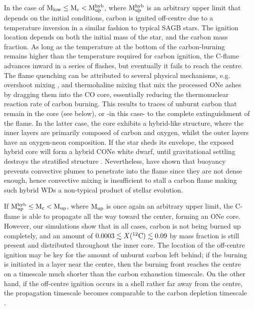 \documentclass[../../main/thesis_msc.tex]{subfiles}
\begin{document}
    In the case of $\rm M_{\rm low} \leq \rm M_c < \rm M_{\rm up}^{\rm hyb}$, where $\rm M_{\rm up}^{\rm hyb}$ is an arbitrary upper limit that depends on the initial conditions, carbon is ignited off-centre due to a temperature inversion in a similar fashion to typical SAGB stars. The ignition location  depends on both the initial mass of the star, and the carbon mass fraction. As long as the temperature at the bottom of the carbon-burning remains higher than the temperature required for carbon ignition, the C-flame advances inward in a series of flashes, but eventually it fails to reach the centre. The flame quenching can be attributed to several physical mechanisms, e.g. overshoot mixing \citep{Denissenkov:2013qaa, Chen2014, Farmer:2015afs}, and thermohaline mixing \citep{Siess2009} that mix the processed ONe ashes by dragging them into the CO core, essentially reducing the thermonuclear reaction rate of carbon burning. This results to traces of unburnt carbon that remain in the core (see below), or -in this case- to the complete extinguishment of the flame. In the latter case, the core exhibits a hybrid-like structure, where the inner layers are primarily composed of carbon and oxygen, whilst the outer layers have an oxygen-neon composition. If the star sheds its envelope, the exposed hybrid core will form a hybrid CONe white dwarf, until gravitational settling destroys the stratified structure \citep[see also][]{brooks2017, Schwab2019b}. Nevertheless, \cite{Lecoanet2016} have shown that buoyancy prevents convective plumes to penetrate into the flame since they are not dense enough, hence convective mixing is insufficient to stall a carbon flame making such hybrid WDs a non-typical product of stellar evolution.
    
    If $\rm M_{\rm up}^{\rm hyb} \leq \rm M_c < \rm M_{\rm up}$, where $\rm M_{\rm up}$ is once again an arbitrary upper limit, the C-flame is able to propagate all the way toward the center, forming an ONe core. However, our simulations show that in all cases, carbon is not being burned up completely, and an amount of $0.0003 \lesssim X(^{12}\rm C) \lesssim 0.09$ by mass fraction is still present and distributed throughout the inner core. The location of the off-centre ignition may be key for the amount of unburnt carbon left behind; if the burning is initiated in a layer near the centre, then the burning front reaches the centre on a timescale much shorter than the carbon exhaustion timescale. On the other hand, if the off-centre ignition occurs in a shell rather far away from the centre, the propagation timescale becomes comparable to the carbon depletion timescale \citep{Dominguez1993}.
    
\end{document}
